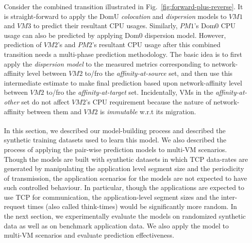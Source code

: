 Consider the combined transition illustrated in Fig.~\ref{fig:forward-plus-reverse}.
It is straight-forward
to apply the DomU \textit{colocation} and \textit{dispersion} models to
$VM1$ and $VM3$ to predict their resultant CPU usages. Similarly, $PM1$'s
Dom0 CPU usage can also be predicted by applying Dom0 dispersion model.
However, prediction of $VM2$'s and $PM2$'s resultant CPU usage after this
combined transition needs a multi-phase prediction methodology.
The basic idea is to first apply the \textit{dispersion model} to the
measured metrics corresponding to network-affinity level between $VM2$
to/fro the \textit{affinity-at-source} set, and then use this
intermediate estimate
to make final prediction based upon network-affinity level
between $VM2$ to/fro the \textit{affinity-at-target} set. Incidentally,
VMs in the \textit{affinity-at-other} set do not affect $VM2$'s CPU
requirement because the nature of network-affinity
between them and $VM2$ is \textit{immutable} w.r.t its migration.
\\
\\
In this section, we described our model-building process and described
the synthetic training datasets used to learn this model.
We also described the process of applying the pair-wise prediction
models to multi-VM scenarios.
Though the models are built with synthetic datasets in which
TCP data-rates are generated by manipulating the application level
segment size and the periodicity of transmission, the application
scenarios for the models are not expected to have such controlled
behaviour. In particular, though the applications are
expected to use TCP for communication, the application-level
segment sizes and the inter-request times (also called think-times)
would be significantly more random. In the next section, we experimentally
evaluate the models on randomized synthetic data as well as on
benchmark application data. We also apply the model to multi-VM
scenarios and evaluate prediction effectiveness.
